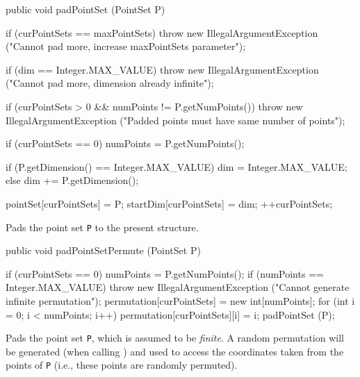 \begin{code}

   public void padPointSet (PointSet P) \begin{hide} {
      if (curPointSets == maxPointSets)
         throw new IllegalArgumentException
            ("Cannot pad more, increase maxPointSets parameter");

      if (dim == Integer.MAX_VALUE)
         throw new IllegalArgumentException
            ("Cannot pad more, dimension already infinite");

      if (curPointSets > 0 && numPoints != P.getNumPoints())
         throw new IllegalArgumentException
            ("Padded points must have same number of points");

      if (curPointSets == 0)
          numPoints = P.getNumPoints();
      
      if (P.getDimension() == Integer.MAX_VALUE)
          dim = Integer.MAX_VALUE;
      else
          dim += P.getDimension();

      pointSet[curPointSets] = P;
      startDim[curPointSets] = dim;
      ++curPointSets;
   }\end{hide}
\end{code}
 \begin{tabb}
   Pads the point set \texttt{P} to the present structure.
 \end{tabb}
\begin{htmlonly}
\end{htmlonly}
\begin{code}

   public void padPointSetPermute (PointSet P) \begin{hide} {
      if (curPointSets == 0)
          numPoints = P.getNumPoints();
      if (numPoints == Integer.MAX_VALUE)
         throw new IllegalArgumentException
            ("Cannot generate infinite permutation");
      permutation[curPointSets] = new int[numPoints];
      for (int i = 0; i < numPoints; i++)
         permutation[curPointSets][i] = i;
      padPointSet (P);
   }\end{hide}
\end{code}
 \begin{tabb}
   Pads the point set \texttt{P}, which is assumed to be \emph{finite}.
   A random permutation will be
   generated (when calling ) and used to access the 
   coordinates taken from the points of \texttt{P} (i.e., these points
   are randomly permuted).  
 \end{tabb}
